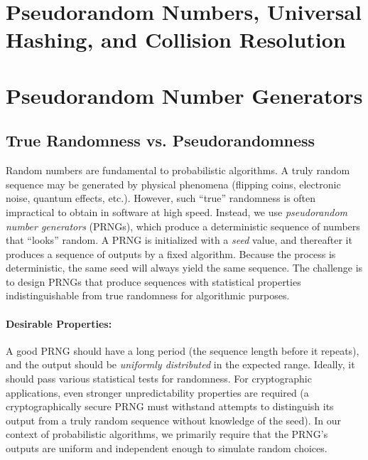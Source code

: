 \documentclass[11pt]{article}
\begin{document}


\section*{Pseudorandom Numbers, Universal Hashing, and Collision Resolution}

\section{Pseudorandom Number Generators}
\label{sec:pseudorandom}
\subsection{True Randomness vs. Pseudorandomness}
Random numbers are fundamental to probabilistic algorithms. A truly random sequence may be generated by physical phenomena (flipping coins, electronic noise, quantum effects, etc.). However, such “true” randomness is often impractical to obtain in software at high speed. Instead, we use \emph{pseudorandom number generators} (PRNGs), which produce a deterministic sequence of numbers that “looks” random. A PRNG is initialized with a \emph{seed} value, and thereafter it produces a sequence of outputs by a fixed algorithm. Because the process is deterministic, the same seed will always yield the same sequence. The challenge is to design PRNGs that produce sequences with statistical properties indistinguishable from true randomness for algorithmic purposes.

\paragraph{Desirable Properties:} A good PRNG should have a long period (the sequence length before it repeats), and the output should be \emph{uniformly distributed} in the expected range. Ideally, it should pass various statistical tests for randomness. For cryptographic applications, even stronger unpredictability properties are required (a cryptographically secure PRNG must withstand attempts to distinguish its output from a truly random sequence without knowledge of the seed). In our context of probabilistic algorithms, we primarily require that the PRNG’s outputs are uniform and independent enough to simulate random choices.
\end{document}
